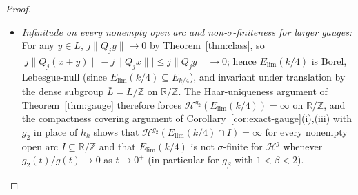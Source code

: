 \documentclass[11pt]{article}
\theoremstyle{definition}
\theoremstyle{remark}
\newcommand{\R}{\mathbb{R}}
\newcommand{\Z}{\mathbb{Z}}
\begin{document}
\begin{proof}
\begin{itemize}[leftmargin=1.8em]
$x(\omega)=\lim_{j\to\infty}M_j/Q_j$ satisfies $|Q_jx(\omega)-M_j|<k/j<1/8$ and
has true recurrence digits $d_j(x(\omega))=d_j\in\{-k,+k\}$ for all $j\ge N$, so
$|d_j(x(\omega))|=k$ and $j\|Q_jx(\omega)\|\to k/4$. Hence the compact binary
Cantor image $K_{\mathrm{bin}}:=x(\{-k,+k\}^{\{j\ge N\}})$ lies entirely inside
$E_{\mathrm{lim}}(k/4)\cap[-4k/Q_{N+1},4k/Q_{N+1}]$ (no strict sublevel needs to
be subtracted). Equip $\{-k,+k\}^{\{j\ge N\}}$ with the uniform Bernoulli
product measure assigning weight $1/2$ to $-k$ and $1/2$ to $+k$, and let
$\mu_{\mathrm{bin}}$ be its pushforward to $K_{\mathrm{bin}}$. As in the proof
of Theorem~\ref{thm:gauge}, any interval $U$ of length
$1/Q_{n+1}\le h<1/Q_n$ ($n>N$) determines a unique $M_j$ for each $N\le j<n$ and
at most $3$ values of $M_n$, so $K_{\mathrm{bin}}\cap U$ meets at most $3$ binary
cylinders of depth $n-N$, each of $\mu_{\mathrm{bin}}$-mass $2^{-(n-N)}$. Thus
\[
\mu_{\mathrm{bin}}(U)\le 3\cdot 2^{-(n-N)}=3\cdot 2^{N+1}\cdot 2^{-(n+1)}
\le 3\cdot 2^{N+1}g_2(h),
\]
and the mass distribution principle gives
$\mathcal H^{g_2}(E_{\mathrm{lim}}(k/4))\ge\mathcal H^{g_2}(K_{\mathrm{bin}})\ge(3\cdot 2^{N+1})^{-1}>0$.
\item \emph{Infinitude on every nonempty open arc and non-$\sigma$-finiteness for larger gauges:}
For any $y\in L$, $j\|Q_jy\|\to0$ by Theorem~\ref{thm:class}, so
$\bigl|j\|Q_j(x+y)\|-j\|Q_jx\|\bigr|\le j\|Q_jy\|\to0$; hence
$E_{\mathrm{lim}}(k/4)$ is Borel, Lebesgue-null (since
$E_{\mathrm{lim}}(k/4)\subseteq E_{k/4}$), and invariant under translation by
the dense subgroup $\bar L=L/\Z$ on $\R/\Z$. The Haar-uniqueness argument of
Theorem~\ref{thm:gauge} therefore forces
$\mathcal H^{g_2}(E_{\mathrm{lim}}(k/4))=\infty$ on $\R/\Z$, and the compactness
covering argument of Corollary~\ref{cor:exact-gauge}(i),(iii) with $g_2$ in
place of $h_k$ shows that $\mathcal H^{g_2}(E_{\mathrm{lim}}(k/4)\cap I)=\infty$
for every nonempty open arc $I\subseteq\R/\Z$ and that $E_{\mathrm{lim}}(k/4)$
is not $\sigma$-finite for $\mathcal H^g$ whenever $g_2(t)/g(t)\to0$ as
$t\to0^+$ (in particular for $g_\beta$ with $1<\beta<2$).
\end{itemize}


\end{proof}
\end{document}
